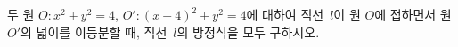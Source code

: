 두 원 $O:x^2+y^2=4$, $O':(x-4)^2+y^2=4$에 대하여 직선~$l$이 원 $O$에 접하면서 원 $O'$의 넓이를 이등분할 때, 직선~$l$의 방정식을 모두 구하시오.
